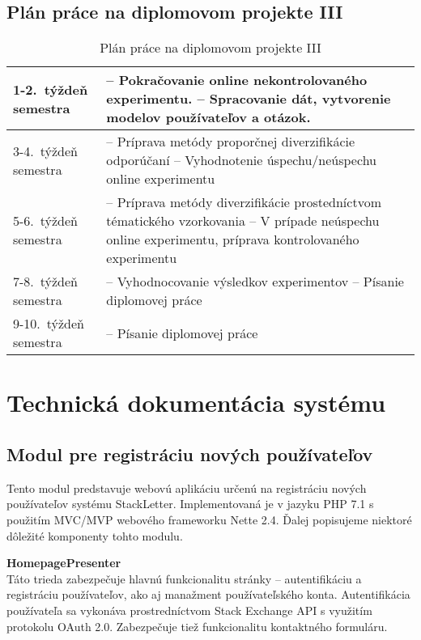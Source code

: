 \newpage
\section{Plán práce na diplomovom projekte III}\label{apx:dp3plan}

\begin{table}[h]
\centering
\caption{Plán práce na diplomovom projekte III}
\begin{tabular}{|m{2.3cm}|m{12cm}|}
\hline
1-2.~týždeň semestra & -- Pokračovanie online nekontrolovaného experimentu.
			  \newline -- Spracovanie dát, vytvorenie modelov používateľov a otázok. \\ \hline
3-4.~týždeň semestra & -- Príprava metódy proporčnej diverzifikácie odporúčaní
			  \newline -- Vyhodnotenie úspechu/neúspechu online experimentu \\ \hline
5-6.~týždeň semestra & -- Príprava metódy diverzifikácie prostedníctvom tématického vzorkovania
              \newline -- V prípade neúspechu online experimentu, príprava kontrolovaného experimentu \\ \hline
7-8.~týždeň semestra & -- Vyhodnocovanie výsledkov experimentov
			  \newline -- Písanie diplomovej práce \\ \hline
9-10.~týždeň semestra & -- Písanie diplomovej práce \\ \hline
\end{tabular}
\end{table}

\afterpage{\blankpage}
\newpage
\chapter{Technická dokumentácia systému}\label{tech-doc}

\section{Modul pre registráciu nových používateľov}

Tento modul predstavuje webovú aplikáciu určenú na registráciu nových používateľov systému StackLetter. Implementovaná je
v jazyku PHP 7.1 s použitím MVC/MVP webového frameworku Nette 2.4. Ďalej popisujeme niektoré dôležité komponenty tohto modulu.

\textbf{HomepagePresenter}\\
Táto trieda zabezpečuje hlavnú funkcionalitu stránky -- autentifikáciu a registráciu používateľov, ako aj manažment
používateľského konta. Autentifikácia používateľa sa vykonáva prostredníctvom Stack Exchange API s využitím protokolu OAuth 2.0.
Zabezpečuje tiež funkcionalitu kontaktného formuláru.

